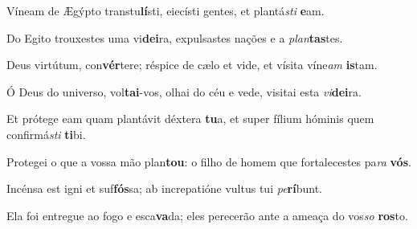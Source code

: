 \begin{greenumerate}
  \setcounter{enumi}{1}


  \item Víneam de Ægýpto transtu\textbf{lí}sti, {\GreStar} eiecísti gentes, et plantá\textit{sti} \textbf{e}am. 

  \switchcolumn\setcounter{enumi}{1}

  \item Do Egito trouxestes uma vi\textbf{dei}ra, {\GreStar} expulsastes nações e a \textit{plan}\textbf{tas}tes. 

  \switchcolumn*


  \item Deus virtútum, con\textbf{vér}tere; {\GreStar} réspice de cælo et vide, et vísita víne\textit{am} \textbf{is}tam. 

  \switchcolumn%

  \item Ó Deus do universo, vol\textbf{tai}-vos, {\GreStar} olhai do céu e vede, visitai esta \textit{vi}\textbf{dei}ra. 

  \switchcolumn*


  \item Et prótege eam quam plantávit déxtera \textbf{tu}a, {\GreStar} et super fílium hóminis quem confirmá\textit{sti} \textbf{ti}bi. 

  \switchcolumn%

  \item Protegei o que a vossa mão plan\textbf{tou}: {\GreStar} o filho de homem que fortalecestes pa\textit{ra} \textbf{vós}. 

  \switchcolumn*


  \item Incénsa est igni et suf\textbf{fós}sa; {\GreStar} ab increpatióne vultus tui \textit{pe}\textbf{rí}bunt. 

  \switchcolumn%

  \item Ela foi entregue ao fogo e esca\textbf{va}da; {\GreStar} eles perecerão ante a ameaça do vos\textit{so} \textbf{ros}to. 

  \switchcolumn*


\end{greenumerate}
